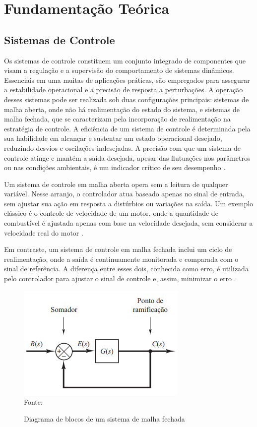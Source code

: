 \chapter{Fundamentação Teórica}


\section{Sistemas de Controle}

Os sistemas de controle constituem um conjunto integrado de componentes que visam a regulação e a supervisão do
comportamento de sistemas dinâmicos.
Essenciais em uma muitas de aplicações práticas, são empregados para assegurar a estabilidade operacional e a precisão
de resposta a perturbações.
A operação desses sistemas pode ser realizada sob duas configurações principais: sistemas de malha aberta,
onde não há realimentação do estado do sistema, e sistemas de malha fechada, que se caracterizam pela incorporação de
realimentação na estratégia de controle.
A eficiência de um sistema de controle é determinada pela sua habilidade em alcançar e sustentar um estado operacional
desejado, reduzindo desvios e oscilações indesejadas.
A precisão com que um sistema de controle atinge e mantém a saída desejada, apesar das flutuações nos parâmetros ou nas
condições ambientais, é um indicador crítico de seu desempenho \cite{ogata2010engenharia}.

Um sistema de controle em malha aberta opera sem a leitura de qualquer variável.
Nesse arranjo, o controlador atua baseado apenas no sinal de entrada, sem ajustar sua ação em resposta a distúrbios ou
variações na saída.
Um exemplo clássico é o controle de velocidade de um motor, onde a quantidade de combustível é ajustada apenas com base
na velocidade desejada, sem considerar a velocidade real do motor \cite{ogata2010engenharia}.

Em contraste, um sistema de controle em malha fechada inclui um ciclo de realimentação, onde a saída é continuamente
monitorada e comparada com o sinal de referência.
A diferença entre esses dois, conhecida como erro, é utilizada pelo controlador para ajustar o sinal de controle e,
assim, minimizar o erro \cite{ogata2010engenharia}.

\begin{figure}[H]
    \centering
    \caption{Diagrama de blocos de um sistema de malha fechada}
    \includegraphics[scale=1]{figuras/closed_loop}
    \label{fig:closed_loop}
    \\
    \vspace{0cm}\hspace{0cm}\small{Fonte: \cite[Fig 2.3]{ogata2010engenharia}}
\end{figure}


